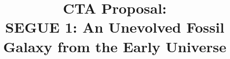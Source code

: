 \documentclass{aastex63}
\begin{document}
\title{CTA Proposal:\\SEGUE 1: An Unevolved Fossil Galaxy from the Early Universe}


\end{document}
